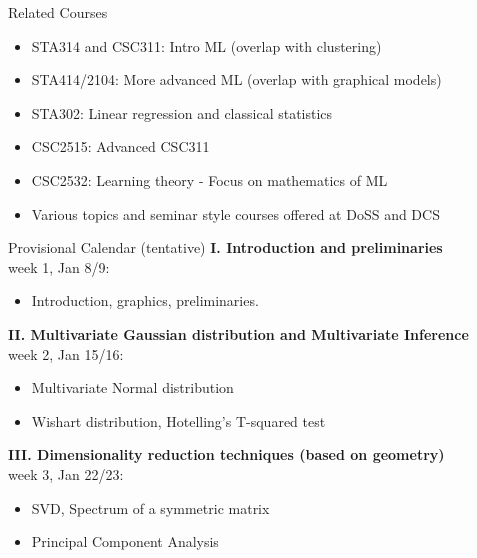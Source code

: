 \documentclass[11pt,handout,aspectratio=169]{beamer}
\begin{document}
%



\begin{frame}
  {Related Courses}
  \begin{itemize}
    \item STA314 and CSC311: Intro ML (overlap with clustering)\\[.2cm]
    \item {STA414/2104}: More advanced ML (overlap with graphical models)\\[.2cm]
    \item STA302: Linear regression and classical statistics   \\[.2cm]     
    \item CSC2515: Advanced CSC311\\[.2cm]
    \item CSC2532: Learning theory - Focus on mathematics of ML\\[.2cm]
    \item Various topics and seminar style courses offered at DoSS and DCS


  \end{itemize}
\end{frame}



\begin{frame}{Provisional Calendar (tentative)}
\small
\noindent \textbf{I. Introduction and preliminaries}\\
week 1, Jan 8/9: \\[-1mm]
	\begin{itemize}
        \item Introduction, graphics, preliminaries.
	\end{itemize}

\noindent \textbf{II. Multivariate Gaussian distribution and Multivariate Inference}\\
week 2, Jan 15/16: \\[-1mm]
\begin{itemize}
\item Multivariate Normal distribution
\item Wishart distribution, Hotelling's T-squared test 
\end{itemize}

\noindent \textbf{III. Dimensionality reduction techniques (based on geometry)}\\
week 3, Jan 22/23:\\[-1mm]
\begin{itemize}
\item SVD, Spectrum of a symmetric matrix
  \item Principal Component Analysis
\end{itemize}
\end{frame}
\end{document}
